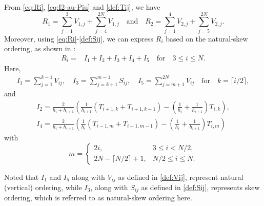 \documentclass{amsart}
\theoremstyle{definition}
\theoremstyle{remark}
\numberwithin{equation}{section}
\begin{document}
From \eqref{eq:Ri}, \eqref{eq:I2-au-Piu} and \eqref{def:Tij}, we have %
\begin{equation} \label{eq:departR1R2}
  R_1 = \sum_{j=1}^3 V_{1,j} + \sum_{j=4}^{2N} V_{1,j} \quad \text{and} \quad
  R_2 = \sum_{j=1}^4 V_{2,j} + \sum_{j=5}^{2N} V_{2,j}.
\end{equation}
Moreover, using \eqref{eq:Ri}-\eqref{def:Sij}, 
we can express $R_i$ based on the {natural-skew ordering}, as shown in  :
\begin{equation} \label{eq:depart-Ri}
  \begin{aligned}
    R_i = & I_1 + I_2 + I_3 + I_4 + I_5   \quad \text{for} \quad   3\le i \le N .
  \end{aligned}
\end{equation}
Here, 
\begin{gather*}
    I_1 =  \sum_{j=1}^{k-1} V_{ij}     , \quad
    I_3 = \sum_{j=k+1}^{m-1} S_{ij}    , \quad
    I_5 =  \sum_{j=m+1}^{2N} V_{ij}    
    \quad \text{for} \quad k=\lceil i/2\rceil,
\end{gather*}
and
\begin{gather*}
    I_2 =  \frac{2}{h_i + h_{i+1}}
    \left( \frac{1}{h_{i+1}} (T_{i+1, k} +  T_{i+1, k+1})
    - (\frac{1}{h_{i}}+\frac{1}{h_{i+1}}) T_{i,k} \right) ,  \\
    I_4 =  \frac{2}{h_i + h_{i+1}}
    \left( \frac{1}{h_{i}} (T_{i-1, m} +  T_{i-1, m-1})
    - (\frac{1}{h_{i}}+\frac{1}{h_{i+1}}) T_{i,m} \right)
\end{gather*}
with
\begin{equation} \label{def:m2c}
m= \begin{cases}    
2i, & 3\le i < N/2, \\ 2N-\lceil N/2 \rceil + 1, & N/2 \le i \le N.
\end{cases}
\end{equation}

Noted that \(I_1\) and \(I_5\) along with $V_{ij}$ as defined in \eqref{def:Vij}, represent natural (vertical) ordering, while \(I_3\), along with $S_{ij}$ as defined in \eqref{def:Sij}, represents skew ordering, which is referred to as natural-skew ordering here.
\end{document}
